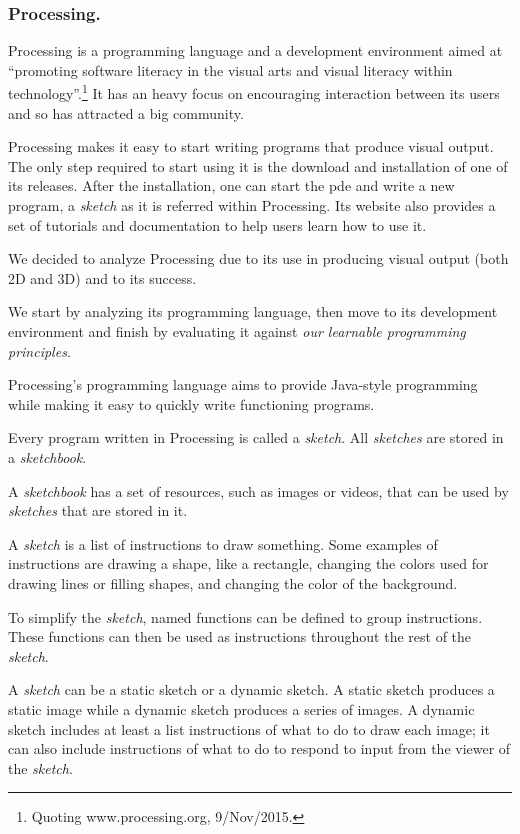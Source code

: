 \documentclass{./llncs2e/llncs}
\begin{document}
\subsubsection{Processing.}
	Processing\cite{reas2007processing} is a programming language and a development environment aimed at ``promoting software literacy in the visual arts and visual literacy within technology''.\footnote{Quoting www.processing.org, 9/Nov/2015.}
	It has an heavy focus on encouraging interaction between its users and so has attracted a big community.
	
	Processing makes it easy to start writing programs that produce visual output. 
	The only step required to start using it is the download and installation of one of its releases. 
	After the installation, one can start the \ac{pde} and write a new program, a \emph{sketch} as it is referred within Processing. 
	Its website also provides a set of tutorials and documentation to help users learn how to use it.
	
	We decided to analyze Processing due to its use in producing visual output (both 2D and 3D) and to its success.
	
	We start by analyzing its programming language, then move to its development environment and finish by evaluating it against \emph{our learnable programming principles}.
	
	Processing's programming language aims to provide Java-style programming while making it easy to quickly write functioning programs. 
	
	Every program written in Processing is called a \emph{sketch}. 
	All \emph{sketches} are stored in a \emph{sketchbook}.
	
	A \emph{sketchbook} has a set of resources, such as images or videos, that can be used by \emph{sketches} that are stored in it.
	
	A \emph{sketch} is a list of instructions to draw something. 
	Some examples of instructions are drawing a shape, like a rectangle, changing the colors used for drawing lines or filling shapes, and changing the color of the background.
	
	To simplify the \emph{sketch}, named functions can be defined to group instructions. 
	These functions can then be used as instructions throughout the rest of the \emph{sketch}.
	
	A \emph{sketch} can be a static sketch or a dynamic sketch. 
	A static sketch produces a static image while a dynamic sketch produces a series of images. 
	A dynamic sketch includes at least a list instructions of what to do to draw each image; it can also include instructions of what to do to respond to input from the viewer of the \emph{sketch}.
	
\end{document}
